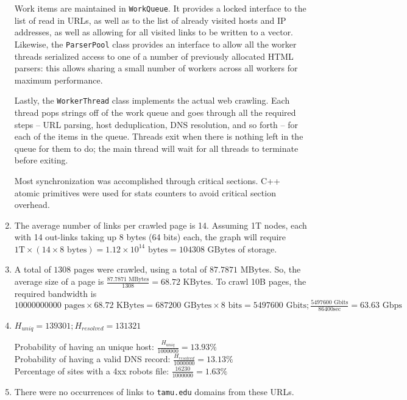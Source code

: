 \documentclass[11pt]{article}
\begin{document}
\begin{enumerate}
{Work items are maintained in \texttt{WorkQueue}. It provides a locked interface to the list of read in URLs, as well as to the list of already visited hosts and IP addresses, as well as allowing for all visited links to be written to a vector. Likewise, the \texttt{ParserPool} class provides an interface to allow all the worker threads serialized access to one of a number of previously allocated HTML parsers: this allows sharing a small number of workers across all workers for maximum performance.

Lastly, the \texttt{WorkerThread} class implements the actual web crawling. Each thread pops strings off of the work queue and goes through all the required steps -- URL parsing, host deduplication, DNS resolution, and so forth -- for each of the items in the queue. Threads exit when there is nothing left in the queue for them to do; the main thread will wait for all threads to terminate before exiting.

Most synchronization was accomplished through critical sections. C++ atomic primitives were used for stats counters to avoid critical section overhead.
}

\item {
	The average number of links per crawled page is 14. Assuming 1T nodes, each with 14 out-links taking up 8 bytes (64 bits) each, the graph will require $1\text{T} \times (14 \times 8 \text{ bytes}) = 1.12\times10^{14} \text{ bytes} = 104308 \text{ GBytes} $ of storage.
}

\item {
	A total of $1308$ pages were crawled, using a total of $87.7871$ MBytes. So, the average size of a page is $\frac{87.7871 \text{ MBytes}}{1308} = 68.72 \text{ KBytes}$. To crawl 10B pages, the required bandwidth is $ 10000000000 \text{ pages} \times 68.72 \text{ KBytes} = 687200 \text{ GBytes} \times 8 \text{ bits} = 5497600 \text{ Gbits}; \frac{5497600 \text{ Gbits}}{86400 \text{sec}} = 63.63 \text{ Gbps}$
}

\item {
	$H_{uniq} = 139301; H_{resolved} = 131321$
	
	Probability of having an unique host: $\frac{H_{uniq}}{1000000} = 13.93 \%$ \\
	Probability of having a valid DNS record: $\frac{H_{resolved}}{1000000} = 13.13 \%$ \\
	Percentage of sites with a 4xx robots file: $\frac{16230}{1000000} = 1.63 \%$ \\
}

\item {
	There were no occurrences of links to \texttt{tamu.edu} domains from these URLs.
}

\end{enumerate}
\end{document}
